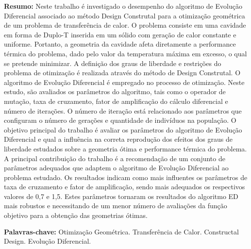 \documentclass[12pt,A4,A4pt]{article}
\begin{document}
\begin{flushleft}
{\small {} \justify
\textbf{Resumo:} Neste trabalho é investigado o desempenho do algoritmo de Evolução Diferencial associado ao método Design Construtal para a otimização geométrica de um problema de transferência de calor. O problema consiste em uma cavidade em forma de Duplo-T inserida em um sólido com geração de calor constante e uniforme. Portanto, a geometria da cavidade afeta diretamente a performance térmica do problema, dado pelo valor da temperatura máxima em excesso, o qual se pretende minimizar. A definição dos graus de liberdade e restrições do problema de otimização é realizada através do método de Design Construtal. O algoritmo de Evolução Diferencial é empregado no processo de otimização. Neste estudo, são avaliados os parâmetros do algoritmo, tais como o operador de mutação, taxa de cruzamento, fator de amplificação do cálculo diferencial e número de iterações. O número de iteração está relacionado aos parâmetros que configuram o número de gerações e quantidade de indivíduos na população.  O objetivo principal do trabalho é avaliar os parâmetros do algoritmo de Evolução Diferencial e qual a influência na correta reprodução dos efeitos dos graus de liberdade estudados sobre a geometria ótima e performance térmica do problema. A principal contribuição do trabalho é a recomendação de um conjunto de parâmetros adequados que adaptem o algoritmo de Evolução Diferencial ao problema estudado. Os resultados indicam como mais influentes os parâmetros de taxa de cruzamento e fator de amplificação, sendo mais adequados os  respectivos valores de 0,7 e 1,5. Estes parâmetros tornaram os resultados do algoritmo ED mais robustos e necessitando de um menor número de avaliações da função objetivo para a obtenção das geometrias ótimas.

\vspace{0.3cm}

\noindent\textbf{Palavras-chave:} Otimização Geométrica. Transferência de Calor. Constructal Design. Evolução Diferencial.}
\end{flushleft}


\end{document}
